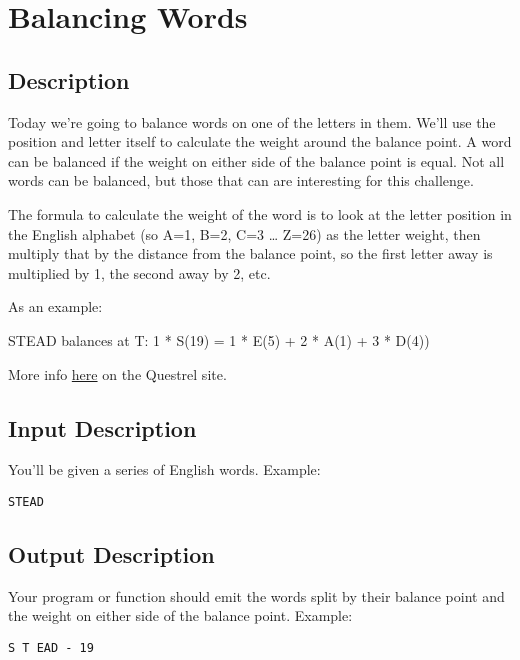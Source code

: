 \section{Balancing Words}

\subsection*{Description}\label{description-1}

Today we're going to balance words on one of the letters in them. We'll
use the position and letter itself to calculate the weight around the
balance point. A word can be balanced if the weight on either side of
the balance point is equal. Not all words can be balanced, but those
that can are interesting for this challenge.

The formula to calculate the weight of the word is to look at the letter
position in the English alphabet (so A=1, B=2, C=3 \ldots{} Z=26) as the
letter weight, then multiply that by the distance from the balance
point, so the first letter away is multiplied by 1, the second away by
2, etc.

As an example:

STEAD balances at T: 1 * S(19) = 1 * E(5) + 2 * A(1) + 3 * D(4))

More info
\href{http://www.questrel.com/records.html\#spelling_alphabetical_order_entire_word_balance_points}{here}
on the Questrel site.

\subsection*{Input Description}\label{input-description}

You'll be given a series of English words. Example:

\begin{lstlisting}
STEAD
\end{lstlisting}

\subsection*{Output Description}\label{output-description}

Your program or function should emit the words split by their balance
point and the weight on either side of the balance point. Example:

\begin{lstlisting}
S T EAD - 19
\end{lstlisting}

